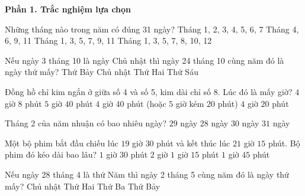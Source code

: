 \textbf{Phần 1. Trắc nghiệm lựa chọn}

\begin{ex} %
Những tháng nào trong năm có đúng 31 ngày?
\choice
{Tháng 1, 2, 3, 4, 5, 6, 7}
{Tháng 4, 6, 9, 11}
{Tháng 1, 3, 5, 7, 9, 11}
{\True Tháng 1, 3, 5, 7, 8, 10, 12}
\end{ex}

\begin{ex} %
Nếu ngày 3 tháng 10 là ngày Chủ nhật thì ngày 24 tháng 10 cùng năm đó là ngày thứ mấy?
\choice
{Thứ Bảy}
{\True Chủ nhật}
{Thứ Hai}
{Thứ Sáu}
\end{ex}

\begin{ex} %
Đồng hồ chỉ kim ngắn ở giữa số 4 và số 5, kim dài chỉ số 8. Lúc đó là mấy giờ?
\choice
{$4$ giờ $8$ phút}
{$5$ giờ $40$ phút}
{\True $4$ giờ $40$ phút (hoặc $5$ giờ kém $20$ phút)}
{$4$ giờ $20$ phút}
\end{ex}

\begin{ex} %
Tháng 2 của năm nhuận có bao nhiêu ngày?
\choice
{\True $29$ ngày}
{$28$ ngày}
{$30$ ngày}
{$31$ ngày}
\end{ex}

\begin{ex} %
Một bộ phim bắt đầu chiếu lúc $19$ giờ $30$ phút và kết thúc lúc $21$ giờ $15$ phút. Bộ phim đó kéo dài bao lâu?
\choice
{$1$ giờ $30$ phút}
{$2$ giờ}
{$1$ giờ $15$ phút}
{\True $1$ giờ $45$ phút}
\end{ex}

\begin{ex} %
Nếu ngày 28 tháng 4 là thứ Năm thì ngày 2 tháng 5 cùng năm đó là ngày thứ mấy?
\choice
{Chủ nhật}
{\True Thứ Hai}
{Thứ Ba}
{Thứ Bảy}
\end{ex}

